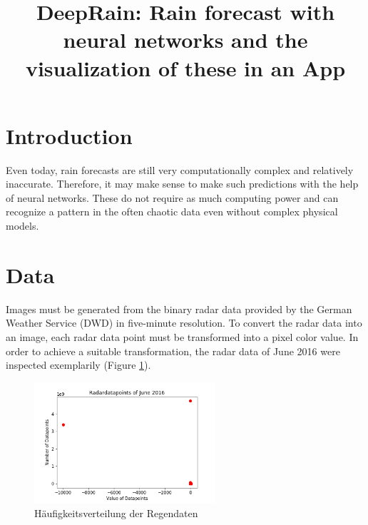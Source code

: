 \documentclass[oneside]{htwg-report}
\begin{document}



\newcommand{\verfasserA}{Simon Christofzik}
\newcommand{\verfasserB}{Paul Sutter}
\newcommand{\verfasserC}{Till Reitlinger}
\newcommand{\thema}{DeepRain: Rain forecast with neural networks and the visualization of these in an App}
\newcommand{\hoschschule}{HTWG Konstanz - University of Applied Sciences}
\newcommand{\institut}{HTWG Konstanz - Institute for Optical Systems}
\newcommand{\prueferA}{Prof. Dr. Oliver Dürr}


\title[Teamprojektthema]{\thema}


\makecover[]


\twocolumn
\section*{Introduction}
    \begin{sloppypar}
        Even today, rain forecasts are still very computationally complex and relatively inaccurate. 
        Therefore, it may make sense to make such predictions with the help of neural networks. 
        These do not require as much computing power and can recognize a pattern in the often chaotic data even without complex physical models.
    \end{sloppypar}

\section*{Data}\label{data}
Images must be generated from the binary radar data provided by the German Weather Service (DWD) in five-minute resolution.
To convert the radar data into an image, each radar data point must be transformed into a pixel color value.
In order to achieve a suitable transformation, the radar data of June 2016 were inspected exemplarily (Figure \ref{fig:Radardatapoints_of_June_2016}). 

\begin{figure}[ht]
    \centering
    \includegraphics[width=0.6\textwidth,angle=0]{../abb/Radardatapoints_of_June_2016.png}
    \caption[Datenaufbereitung]{Häufigkeitsverteilung der Regendaten}
    \label{fig:Radardatapoints_of_June_2016}
\end{figure}
\end{document}
